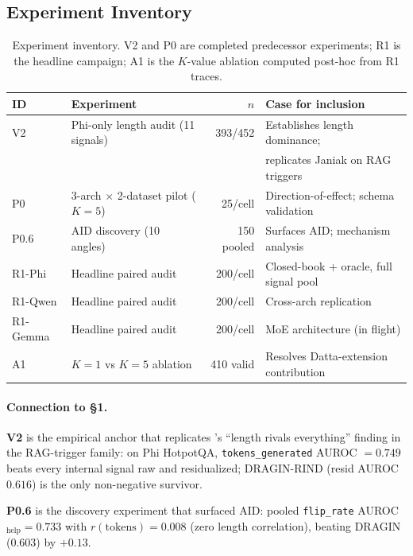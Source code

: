 \documentclass[11pt]{article}
\begin{document}
\subsection{Experiment Inventory}

\begin{table}[h]
\centering\small
\begin{tabular}{@{}llrl@{}}
\toprule
\textbf{ID} & \textbf{Experiment} & \textbf{$n$} &
\textbf{Case for inclusion} \\
\midrule
V2 & Phi-only length audit (11 signals) & 393/452 &
Establishes length dominance; \\
   &                                     &         &
replicates Janiak on RAG triggers \\
P0 & 3-arch $\times$ 2-dataset pilot ($K{=}5$) & 25/cell &
Direction-of-effect; schema validation \\
P0.6 & AID discovery (10 angles) & 150 pooled &
Surfaces AID; mechanism analysis \\
R1-Phi & Headline paired audit & 200/cell &
Closed-book + oracle, full signal pool \\
R1-Qwen & Headline paired audit & 200/cell &
Cross-arch replication \\
R1-Gemma & Headline paired audit & 200/cell &
MoE architecture (in flight) \\
A1 & $K{=}1$ vs $K{=}5$ ablation & 410 valid &
Resolves Datta-extension contribution \\
\bottomrule
\end{tabular}
\caption{Experiment inventory. V2 and P0 are completed predecessor
experiments; R1 is the headline campaign; A1 is the $K$-value
ablation computed post-hoc from R1 traces.}
\end{table}

\paragraph{Connection to \S1.}
\textbf{V2} is the empirical anchor that replicates
\cite{Janiak_IllusionProgressHallucinationDetection}'s ``length
rivals everything'' finding in the RAG-trigger family: on Phi
HotpotQA, \texttt{tokens\_generated} AUROC $= 0.749$ beats every
internal signal raw and residualized; DRAGIN-RIND (resid AUROC
$0.616$) is the only non-negative survivor.

\textbf{P0.6} is the discovery experiment that surfaced AID:
pooled \texttt{flip\_rate} AUROC$_{\text{help}} = 0.733$ with
$r(\text{tokens}) = 0.008$ (zero length correlation), beating
DRAGIN ($0.603$) by $+0.13$.
\end{document}
